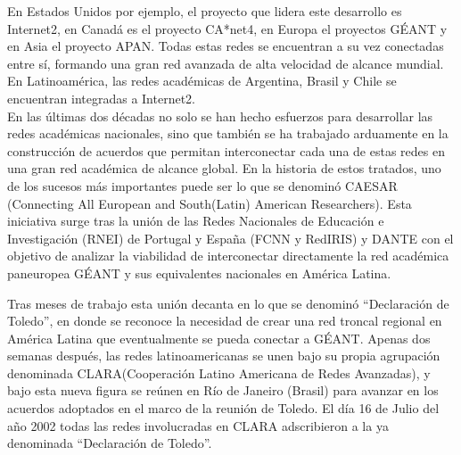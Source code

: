 En Estados Unidos por ejemplo, el proyecto que lidera este desarrollo es Internet2\citep{Internet2}, en Canadá es el proyecto CA*net4\citep{Canarie}, en Europa el proyectos GÉANT\citep{GEANT} y en Asia el proyecto APAN\citep{APAN}. Todas estas redes se encuentran a su vez conectadas entre sí, formando una gran red avanzada de alta velocidad de alcance mundial. En Latinoamérica, las redes académicas de Argentina, Brasil y Chile se encuentran integradas a Internet2.\\

En las \'ultimas dos d\'ecadas no solo se han hecho esfuerzos para desarrollar las redes académicas nacionales, sino que también se ha trabajado arduamente en la construcción de acuerdos que permitan interconectar cada una de estas redes en una gran red académica de alcance global. En la historia de estos tratados, uno de los sucesos m\'as importantes puede ser lo que se denomin\'o CAESAR (Connecting All European and South(Latin) American Researchers). Esta iniciativa surge tras la unión de las Redes Nacionales de Educación e Investigación (RNEI) de Portugal y España (FCNN y RedIRIS) y DANTE con el objetivo de analizar la viabilidad de interconectar directamente la red académica paneuropea GÉANT y sus equivalentes nacionales en América Latina.


Tras meses de trabajo esta unión decanta en lo que se denomin\'o “Declaración de Toledo”, en donde se reconoce la necesidad de crear una red troncal regional en América Latina que eventualmente se pueda conectar a GÉANT. Apenas dos semanas después, las redes latinoamericanas se unen bajo su propia agrupación denominada CLARA(Cooperación Latino Americana de Redes Avanzadas), y bajo esta nueva figura se reúnen en Río de Janeiro (Brasil) para avanzar en los acuerdos adoptados en el marco de la reunión de Toledo. El día 16 de Julio del año 2002 todas las redes involucradas en CLARA adscribieron a la ya denominada “Declaración de Toledo”.\\


